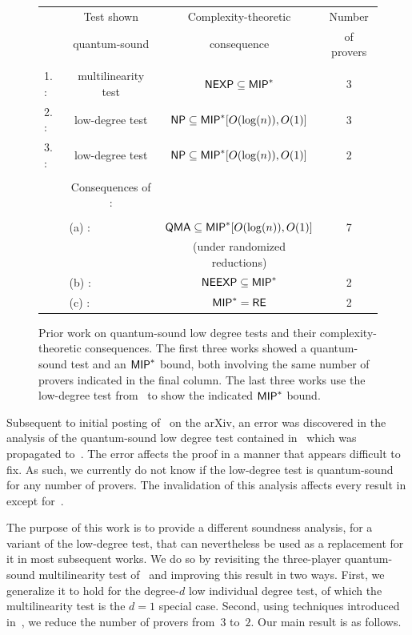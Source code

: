 {
\begin{figure}
\begin{tabular}{l c c c}
& Test shown & Complexity-theoretic  & Number \\
&  quantum-sound &  consequence & of provers  \\
			& &&\\
1. \cite{IV12}: & multilinearity test & $\mathsf{NEXP} \subseteq \mathsf{MIP}^*$ & 3\\[1ex]
2. \cite{Vid16}: & low-degree test & $\mathsf{NP} \subseteq \mathsf{MIP}^*[O(\log(n)), O(1)]$  &3\\[1ex]
3. \cite{NV18b}: & low-degree test & $\mathsf{NP} \subseteq \mathsf{MIP}^*[O(\log(n)), O(1)]$ & 2\\
			& &&\\
& Consequences of \cite{NV18b}: & &\\
			& & &\\
&\multicolumn{1}{l}{\quad\qquad(a) \cite{NV18a}:}   & $\mathsf{QMA} \subseteq \mathsf{MIP}^*[O(\log(n)), O(1)]$ &7\\
&    & (under randomized reductions) &\\[1ex]
&\multicolumn{1}{l}{\quad\qquad (b) \cite{NW19}:}   & $\mathsf{NEEXP} \subseteq \mathsf{MIP}^*$ &2\\[1ex]
&\multicolumn{1}{l}{\quad\qquad (c) \cite{JNV+20}:}   & $\mathsf{MIP}^* = \mathsf{RE}$&2
\end{tabular}
	\caption{Prior work on quantum-sound low degree tests and their complexity-theoretic consequences.
			The first three works showed a quantum-sound test and an $\mathsf{MIP}^*$ bound,
			both involving the same number of provers indicated in the final column.
			The last three works use the low-degree test from~\cite{NV18b}
			to show the indicated $\mathsf{MIP}^*$ bound.}
\label{fig:research}
\end{figure}
}


Subsequent to initial posting of~\cite{JNV+20} on the arXiv,
an error was discovered in the analysis of the quantum-sound low degree test
contained in~\cite{Vid16} which was propagated to~\cite{NV18b}. The error affects the proof in a manner that appears difficult to fix. As such, we currently do not know if the low-degree test is quantum-sound for any number of provers.
The invalidation of this analysis affects every result in  except for~\cite{IV12}.


The purpose of this work is to provide a different soundness analysis, for a variant of the low-degree test, that can nevertheless be used as a replacement for it in most subsequent works. 
We do so by revisiting the three-player quantum-sound multilinearity test of~\cite{IV12}
and improving this result in two ways.
First, we generalize it to hold for the degree-$d$ low individual degree test,
of which the multilinearity test is the $d=1$ special case.
Second, using techniques introduced in~\cite{Vid16,NV18b},
we reduce the number of provers from~$3$ to~$2$.
Our main result is as follows.

